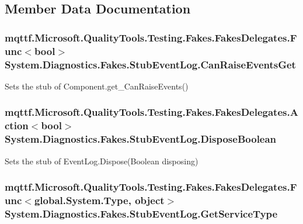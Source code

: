 \subsection{Member Data Documentation}
\hypertarget{class_system_1_1_diagnostics_1_1_fakes_1_1_stub_event_log_a89682a035127270310dacfa763e89f57}{
\subsubsection[{Can\-Raise\-Events\-Get}]{\setlength{\rightskip}{0pt plus 5cm}mqttf.\-Microsoft.\-Quality\-Tools.\-Testing.\-Fakes.\-Fakes\-Delegates.\-Func$<$bool$>$ System.\-Diagnostics.\-Fakes.\-Stub\-Event\-Log.\-Can\-Raise\-Events\-Get}}\label{class_system_1_1_diagnostics_1_1_fakes_1_1_stub_event_log_a89682a035127270310dacfa763e89f57}


Sets the stub of Component.\-get\-\_\-\-Can\-Raise\-Events()

\hypertarget{class_system_1_1_diagnostics_1_1_fakes_1_1_stub_event_log_ad5b5b942e107cc12a6cff423ef33b7c1}{
\subsubsection[{Dispose\-Boolean}]{\setlength{\rightskip}{0pt plus 5cm}mqttf.\-Microsoft.\-Quality\-Tools.\-Testing.\-Fakes.\-Fakes\-Delegates.\-Action$<$bool$>$ System.\-Diagnostics.\-Fakes.\-Stub\-Event\-Log.\-Dispose\-Boolean}}\label{class_system_1_1_diagnostics_1_1_fakes_1_1_stub_event_log_ad5b5b942e107cc12a6cff423ef33b7c1}


Sets the stub of Event\-Log.\-Dispose(\-Boolean disposing)

\hypertarget{class_system_1_1_diagnostics_1_1_fakes_1_1_stub_event_log_af2a241e06f04a6f8738fb5f4d6bc1e2c}{
\subsubsection[{Get\-Service\-Type}]{\setlength{\rightskip}{0pt plus 5cm}mqttf.\-Microsoft.\-Quality\-Tools.\-Testing.\-Fakes.\-Fakes\-Delegates.\-Func$<$global.\-System.\-Type, object$>$ System.\-Diagnostics.\-Fakes.\-Stub\-Event\-Log.\-Get\-Service\-Type}}\label{class_system_1_1_diagnostics_1_1_fakes_1_1_stub_event_log_af2a241e06f04a6f8738fb5f4d6bc1e2c}


